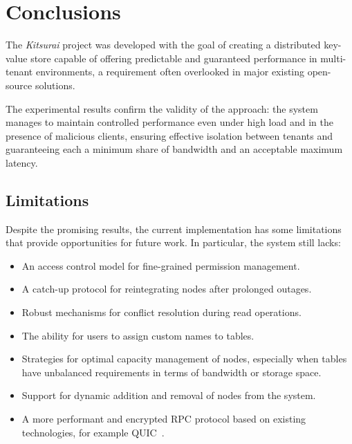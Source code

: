 \section{Conclusions}
\label{sec:conclusions}

The \textit{Kitsurai} project was developed with the goal of creating a distributed key-value store capable of offering predictable and guaranteed performance in multi-tenant environments, a requirement often overlooked in major existing open-source solutions.

The experimental results confirm the validity of the approach: the system manages to maintain controlled performance even under high load and in the presence of malicious clients, ensuring effective isolation between tenants and guaranteeing each a minimum share of bandwidth and an acceptable maximum latency.

\subsection{Limitations}
\label{subsec:limitations}

Despite the promising results, the current implementation has some limitations that provide opportunities for future work. In particular, the system still lacks:

\begin{itemize}
    \item An access control model for fine-grained permission management.
    \item A catch-up protocol for reintegrating nodes after prolonged outages.
    \item Robust mechanisms for conflict resolution during read operations.
    \item The ability for users to assign custom names to tables.
    \item Strategies for optimal capacity management of nodes, especially when tables have unbalanced requirements in terms of bandwidth or storage space.
    \item Support for dynamic addition and removal of nodes from the system.
    \item A more performant and encrypted RPC protocol based on existing technologies, for example QUIC~\cite{QUIC}.
\end{itemize}

